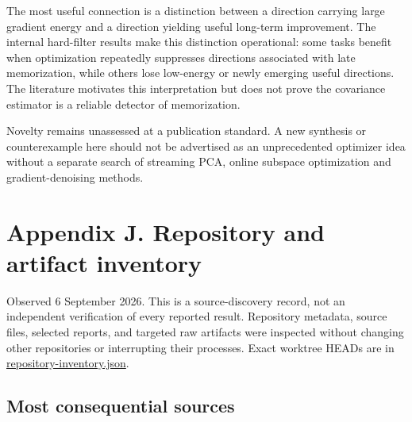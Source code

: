 \documentclass[
  british,
  10pt,
  a4paper,
]{article}
\begin{document}
The most useful connection is a distinction between a direction carrying
large gradient energy and a direction yielding useful long-term
improvement.\allowbreak{} The internal hard-\allowbreak{}filter results
make this distinction operational: some tasks benefit when optimization
repeatedly suppresses directions associated with late
memorization\allowbreak{},\allowbreak{} while others lose low-energy or
newly emerging useful directions.\allowbreak{} The literature motivates
this interpretation but does not prove the covariance estimator is a
reliable detector of memorization\allowbreak{}.\allowbreak{}

Novelty remains unassessed at a publication standard. A new synthesis or
counterexample here should not be advertised as an unprecedented
optimizer idea without a separate search of streaming PCA, online
subspace optimization and gradient-\allowbreak{}denoising methods.

\clearpage

\section{Appendix J. Repository and artifact
inventory}\label{repository-inventory}

Observed 6 September 2026. This is a source-\allowbreak{}discovery
record, not an independent verification of every reported result.
Repository metadata, source files, selected reports, and targeted raw
artifacts were inspected without changing other repositories or
interrupting their processes. Exact worktree HEADs are in
\href{../sources/repository-inventory.json}{repository-\allowbreak{}inventory.\allowbreak{}json}.

\subsection{Most consequential
sources}\label{repository-inventory--most-consequential-sources}
\end{document}
